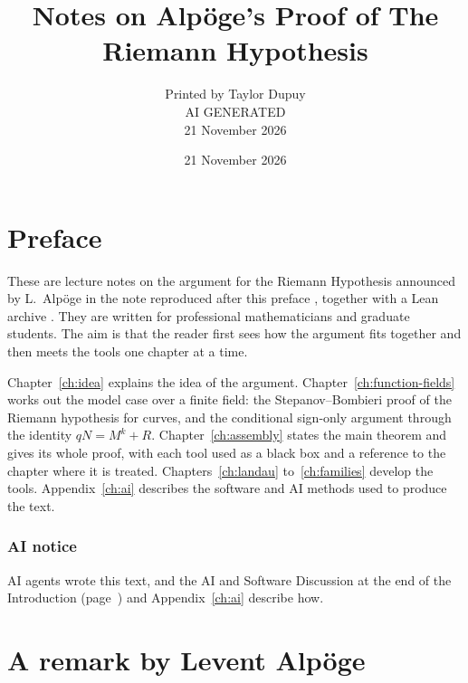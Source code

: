 \documentclass[11pt]{amsbook}
\title{Notes on Alp\"oge's Proof of The Riemann Hypothesis}
\author{Printed by Taylor Dupuy \\
AI GENERATED \\[2ex]
21 November 2026}
\date{21 November 2026}
\theoremstyle{plain}
\theoremstyle{definition}
\theoremstyle{remark}
\numberwithin{equation}{section}
\numberwithin{figure}{chapter}
\numberwithin{table}{chapter}
\begin{document}
\frontmatter
\maketitle
\tableofcontents
\clearpage
\chapter*{Preface}


These are lecture notes on the argument for the Riemann Hypothesis
announced by L.~Alp\"oge in the note reproduced after this preface
\cite{AlpogeRemark2026}, together with a Lean archive
\cite{AlpogeArchive2026}. They are written for professional
mathematicians and graduate students. The aim is that the reader first
sees how the argument fits together and then meets the tools one
chapter at a time.

Chapter~\ref{ch:idea} explains the idea of the argument.
Chapter~\ref{ch:function-fields} works out the model case over a finite
field: the Stepanov--Bombieri proof of the Riemann hypothesis for
curves, and the conditional sign-only argument through the identity
$qN = M^k + R$.
Chapter~\ref{ch:assembly} states the main theorem and gives its whole
proof, with each tool used as a black box and a reference to the
chapter where it is treated. Chapters~\ref{ch:landau}
to~\ref{ch:families} develop the tools.
Appendix~\ref{ch:ai} describes the software and AI methods used to
produce the text.

\subsection*{AI notice}
AI agents wrote this text, and the AI and Software Discussion at
the end of the Introduction (page~\pageref{intro:ai}) and
Appendix~\ref{ch:ai} describe how.
\clearpage
\clearpage
\chapter*{A remark by Levent Alp\"oge}
\begingroup
\newcommand{\remarkdate}[1]{\textbf{#1}}
\newcommand{\remarkpart}[1]{\par\bigskip\noindent
  {\large\bfseries #1}\par\nopagebreak\medskip\noindent\ignorespaces}
\newcommand{\remarkdq}{\textquotedbl}
\newcommand{\remarkone}{\mathds{1}}
\setcounter{footnote}{0}
\renewcommand{\labelenumi}{\arabic{enumi}.}
\end{document}
